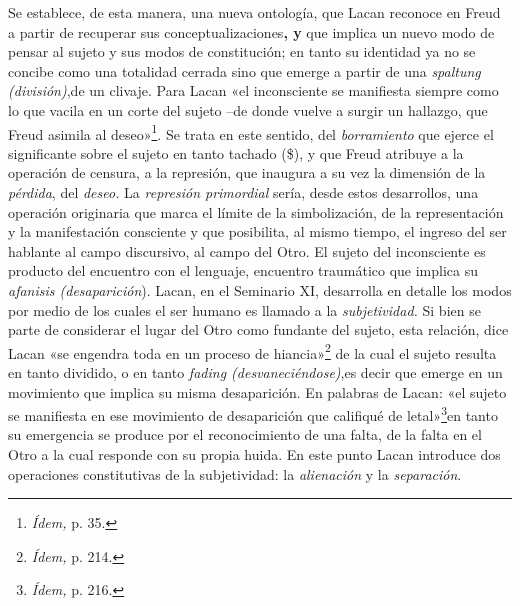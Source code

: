 Se establece, de esta manera, una nueva ontología, que Lacan reconoce en Freud a partir de recuperar sus conceptualizaciones\textbf{, y} que implica un nuevo modo de pensar al sujeto y sus modos de constitución; en tanto su identidad ya no se concibe como una totalidad cerrada sino que emerge a partir de una \emph{spaltung (división)},de un clivaje. Para Lacan «el inconsciente se manifiesta siempre como lo que vacila en un corte del sujeto --de donde vuelve a surgir un hallazgo, que Freud asimila al deseo»\footnote{\emph{Ídem,} p. 35.}. Se trata en este sentido, del \emph{borramiento} que ejerce el significante sobre el sujeto en tanto tachado (\$), y que Freud atribuye a la operación de censura, a la represión, que inaugura a su vez la dimensión de la \emph{pérdida}, del \emph{deseo.} La \emph{represión primordial} sería, desde estos desarrollos, una operación originaria que marca el límite de la simbolización, de la representación y la manifestación consciente y que posibilita, al mismo tiempo, el ingreso del ser hablante al campo discursivo, al campo del Otro. El sujeto del inconsciente es producto del encuentro con el lenguaje, encuentro traumático que implica su \emph{afanisis (desaparición}). Lacan, en el Seminario XI, desarrolla en detalle los modos por medio de los cuales el ser humano es llamado a la \emph{subjetividad.} Si bien se parte de considerar el lugar del Otro como fundante del sujeto, esta relación, dice Lacan «se engendra toda en un proceso de hiancia»\footnote{\emph{Ídem,} p. 214.} de la cual el sujeto resulta en tanto dividido, o en tanto \emph{fading (desvaneciéndose)},es decir que emerge en un movimiento que implica su misma desaparición. En palabras de Lacan: «el sujeto se manifiesta en ese movimiento de desaparición que califiqué de letal»\footnote{\emph{Ídem,} p. 216.}en tanto su emergencia se produce por el reconocimiento de una falta, de la falta en el Otro a la cual responde con su propia huida. En este punto Lacan introduce dos operaciones constitutivas de la subjetividad: la \emph{alienación} y la \emph{separación}.

